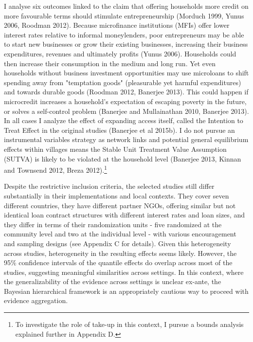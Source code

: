 \documentclass[AER]{AEA}
\begin{document}
I analyse six outcomes linked to the claim that offering households more credit on more favourable terms should stimulate entrepreneurship (Morduch 1999, Yunus 2006, Roodman 2012). Because microfinance institutions (MFIs) offer lower interest rates relative to informal moneylenders, poor entrepreneurs may be able to start new businesses or grow their existing businesses, increasing their business expenditures, revenues and ultimately profits (Yunus 2006). Households could then increase their consumption in the medium and long run. Yet even households without business investment opportunities may use microloans to shift spending away from "temptation goods" (pleasurable yet harmful expenditures) and towards durable goods (Roodman 2012, Banerjee 2013). This could happen if microcredit increases a household's expectation of escaping poverty in the future, or solves a self-control problem (Banerjee and Mullainathan 2010, Banerjee 2013). In all cases I analyze the effect of expanding access itself, called the Intention to Treat Effect in the original studies (Banerjee et al 2015b). I do not pursue an instrumental variables strategy as network links and potential general equilibrium effects within villages means the Stable Unit Treatment Value Assumption (SUTVA) is likely to be violated at the household level (Banerjee 2013, Kinnan and Townsend 2012, Breza 2012).\footnote{To investigate the role of take-up in this context, I pursue a bounds analysis explained further in Appendix D.}

Despite the restrictive inclusion criteria, the selected studies still differ substantially in their implementations and local contexts. They cover seven different countries, they have different partner NGOs, offering similar but not identical loan contract structures with different interest rates and loan sizes, and they differ in terms of their randomization units - five randomized at the community level and two at the individual level - with various encouragement and sampling designs (see Appendix C for details). Given this heterogeneity across studies, heterogeneity in the resulting effects seems likely. However, the 95\% confidence intervals of the quantile effects do overlap across most of the studies, suggesting meaningful similarities across settings. In this context, where the generalizability of the evidence across settings is unclear ex-ante, the Bayesian hierarchical framework is an appropriately cautious way to proceed with evidence aggregation.
\end{document}
